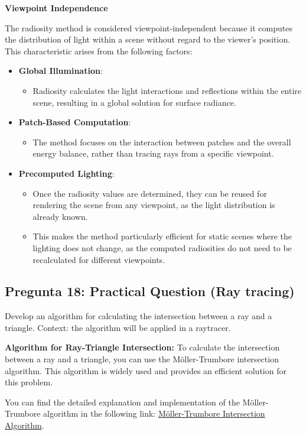 \documentclass{article}
\begin{document}
\textbf{Viewpoint Independence}

The radiosity method is considered viewpoint-independent because it computes the distribution of light within a scene without regard to the viewer's position. This characteristic arises from the following factors:

\begin{itemize}
    \item \textbf{Global Illumination}:
    \begin{itemize}
        \item Radiosity calculates the light interactions and reflections within the entire scene, resulting in a global solution for surface radiance.
    \end{itemize}
    \item \textbf{Patch-Based Computation}:
    \begin{itemize}
        \item The method focuses on the interaction between patches and the overall energy balance, rather than tracing rays from a specific viewpoint.
    \end{itemize}
    \item \textbf{Precomputed Lighting}:
    \begin{itemize}
        \item Once the radiosity values are determined, they can be reused for rendering the scene from any viewpoint, as the light distribution is already known.
        \item This makes the method particularly efficient for static scenes where the lighting does not change, as the computed radiosities do not need to be recalculated for different viewpoints.
    \end{itemize}
\end{itemize}

\subsection{Pregunta 18: Practical Question (Ray tracing)}
Develop an algorithm for calculating the intersection between a ray and a triangle. Context: the algorithm will be applied in a raytracer.

\textbf{Algorithm for Ray-Triangle Intersection:}
To calculate the intersection between a ray and a triangle, you can use the Möller-Trumbore intersection algorithm. This algorithm is widely used and provides an efficient solution for this problem.

You can find the detailed explanation and implementation of the Möller-Trumbore algorithm in the following link: \href{https://en.wikipedia.org/wiki/Möller-Trumbore_intersection_algorithm}{Möller-Trumbore Intersection Algorithm}.
\end{document}
